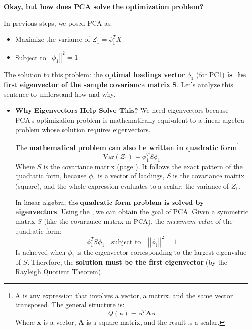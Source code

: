 \begin{flushleft}
    \textcolor{Green3}{ \textbf{Okay, but how does PCA solve the optimization problem?}}
\end{flushleft}
In previous steps, we posed PCA as:
\begin{itemize}
    \item Maximize the variance of $Z_{1} = \phi_{1}^{T} X$
    \item Subject to $\left|\left|\phi_{1}\right|\right|^{2} = 1$
\end{itemize}
The solution to this problem: the \textbf{optimal loadings vector} $\phi_{1}$ (for PC1) \textbf{is the first eigenvector of the sample covariance matrix} $\mathbf{S}$. Let's analyze this sentence to understand how and why.
\begin{itemize}
    \item[\textcolor{Green3}{\faIcon{question-circle}}] \textcolor{Green3}{\textbf{Why Eigenvectors Help Solve This?}} We need eigenvectors because PCA's optimization problem is mathematically equivalent to a linear algebra problem whose solution requires eigenvectors.
    
    The \textbf{mathematical problem can also be written in quadratic form}\footnote{%
        A  is any expression that involves a vector, a matrix, and the same vector transposed. The general structure is:
        \begin{equation}
            Q(\mathbf{x}) = \mathbf{x}^{T} \mathbf{A} \mathbf{x}
        \end{equation}
        Where $\mathbf{x}$ is a vector, $\mathbf{A}$ is a square matrix, and the result is a scalar.
    }
    \begin{equation*}
        \text{Var}\left(Z_{1}\right) = \phi_{1}^{T} S \phi_{1}
    \end{equation*}
    Where $S$ is the covariance matrix (page ). It follows the exact pattern of the quadratic form, because $\phi_{1}$ is a vector of loadings, $S$ is the covariance matrix (square), and the whole expression evaluates to a scalar: the variance of $Z_{1}$.

    In linear algebra, the \textbf{quadratic form problem is solved by eigenvectors}. Using the , we can obtain the goal of PCA. Given a symmetric matrix $S$ (like the covariance matrix in PCA), the \emph{maximum value} of the quadratic form:
    \begin{equation*}
        \phi_{1}^{T} S \phi_{1} \hspace{1em} \text{subject to} \hspace{1em} \left|\left|\phi_{1}\right|\right|^{2} = 1
    \end{equation*}
    Is achieved when $\phi_{1}$ is the eigenvector corresponding to the largest eigenvalue of $S$. Therefore, the \textbf{solution must be the first eigenvector} (by the Rayleigh Quotient Theorem).
\end{itemize}

